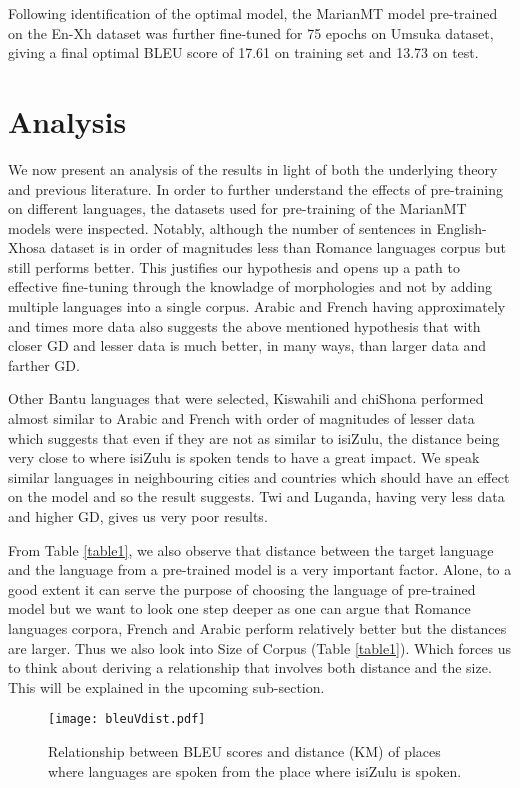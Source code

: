 \documentclass[11pt]{article}
\begin{document}
Following identification of the optimal model, the MarianMT model pre-trained on the En-Xh dataset was further fine-tuned for 75 epochs on Umsuka dataset, giving a final optimal BLEU score of 17.61 on training set and 13.73 on test.  



\section{Analysis}

We now present an analysis of the results in light of both the underlying theory and previous literature. In order to further understand the effects of pre-training on different languages, the datasets used for pre-training of the MarianMT models were inspected. Notably, although the number of sentences in English-Xhosa dataset is in order of magnitudes less than Romance languages corpus but still performs better. This justifies our hypothesis and opens up a path to effective fine-tuning through the knowladge of morphologies and not by adding multiple languages into a single corpus. Arabic and French having approximately  and  times more data also suggests the above mentioned hypothesis that with closer GD and lesser data is much better, in many ways, than larger data and farther GD.

Other Bantu languages that were selected, Kiswahili and chiShona performed almost similar to Arabic and French with order of magnitudes of lesser data which suggests that even if they are not as similar to isiZulu, the distance being very close to where isiZulu is spoken tends to have a great impact. We speak similar languages in neighbouring cities and countries which should have an effect on the model and so the result suggests. Twi and Luganda, having very less data and higher GD, gives us very poor results.

From Table \ref{table1}, we also observe that distance between the target language and the language from a pre-trained model is a very important factor. Alone, to a good extent it can serve the purpose of choosing the language of pre-trained model but we want to look one step deeper as one can argue that Romance languages corpora, French and Arabic perform relatively better but the distances are larger. Thus we also look into Size of Corpus (Table \ref{table1}). Which forces us to think about deriving a relationship that involves both distance and the size. This will be explained in the upcoming sub-section.

\begin{figure*}[h!]
\centering
\texttt{[image: bleuVdist.pdf]}
\caption{Relationship between BLEU scores and distance (KM) of places where languages are spoken from the place where isiZulu is spoken. }
\label{resultfig2}
\end{figure*}
\end{document}
